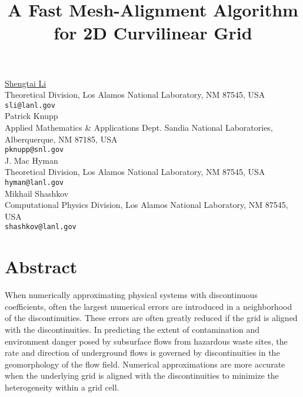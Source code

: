 


\title{A Fast Mesh-Alignment Algorithm for 2D Curvilinear Grid}
\author{} \institute{} %
\maketitle
\begin{center}
{\large\underline{Shengtai Li}}\\
Theoretical Division, Los Alamos National Laboratory, NM 87545, USA\\
{\tt sli@lanl.gov}\\
\vspace{4mm} %
{\large Patrick Knupp} \\
Applied Mathematics \& Applications Dept.
Sandia National Laboratories, 
Alberquerque, NM 87185, USA \\
{\tt pknupp@snl.gov}\\
\vspace{4mm} %
{\large J. Mac Hyman} \\
Theoretical Division, Los Alamos National Laboratory, NM 87545, USA \\
{\tt hyman@lanl.gov}\\
\vspace{4mm} %
{\large Mikhail Shashkov} \\
Computational Physics Division, Los Alamos National Laboratory, NM
87545, USA \\ 
{\tt shashkov@lanl.gov}
\end{center}

\section*{Abstract}

When numerically approximating physical systems with discontinuous 
coefficients, often the largest numerical errors are introduced in a 
neighborhood of the discontinuities. These errors are often greatly 
reduced if the grid is aligned with the discontinuities. 
In predicting the extent of contamination and
environment danger posed by subsurface flows from hazardous waste
sites, the rate and direction of underground flows is governed by
discontinuities in the geomorphology of the flow field.  Numerical
approximations are more accurate when the underlying grid is  aligned
with the discontinuities to minimize the heterogeneity  within a grid cell.

